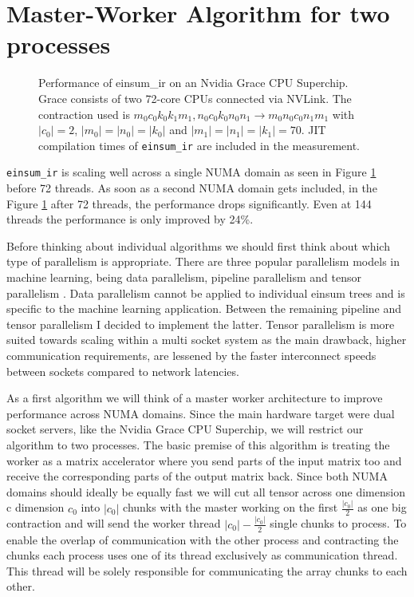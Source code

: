 

\section{Master-Worker Algorithm for two processes}

\begin{figure}[ht]
  \caption{
    Performance of einsum\_ir on an Nvidia Grace CPU Superchip.
    Grace consists of two 72-core CPUs connected via NVLink.
    The contraction used is $m_0c_0k_0k_1m_1, n_0c_0k_0n_0n_1 \rightarrow m_0n_0c_0n_1m_1$ with $|c_0|=2$, $|m_0|=|n_0|=|k_0|$ and $|m_1|=|n_1|=|k_1|=70$.
    JIT compilation times of \texttt{einsum\_ir} are included in the measurement.
    }
  \label{fig:perf_threads}
\end{figure}

\texttt{einsum\_ir} is scaling well across a single NUMA domain as seen in Figure \ref{fig:perf_threads} before 72 threads.
As soon as a second NUMA domain gets included, in the Figure \ref{fig:perf_threads} after 72 threads, the performance drops significantly.
Even at 144 threads the performance is only improved by 24\%.

Before thinking about individual algorithms we should first think about which type of parallelism is appropriate.
There are three popular parallelism models in machine learning, being data parallelism, pipeline parallelism and tensor parallelism \cite{megatronLM}.
Data parallelism cannot be applied to individual einsum trees and is specific to the machine learning application.
Between the remaining pipeline and tensor parallelism I decided to implement the latter.
Tensor parallelism is more suited towards scaling within a multi socket system as the main drawback, higher communication requirements, are lessened by the faster interconnect speeds between sockets compared to network latencies.


As a first algorithm we will think of a master worker architecture to improve performance across NUMA domains.
Since the main hardware target were dual socket servers, like the Nvidia Grace CPU Superchip, we will restrict our algorithm to two processes.
The basic premise of this algorithm is treating the worker as a matrix accelerator where you send parts of the input matrix too and receive the corresponding parts of the output matrix back.
Since both NUMA domains should ideally be equally fast we will cut all tensor across one dimension c dimension $c_0$ into $|c_0|$ chunks with the master working on the first $\frac{|c_0|}{2}$ as one big contraction and will send the worker thread $|c_0|-\frac{|c_0|}{2}$ single chunks to process.
To enable the overlap of communication with the other process and contracting the chunks each process uses one of its thread exclusively as communication thread.
This thread will be solely responsible for communicating the array chunks to each other.

